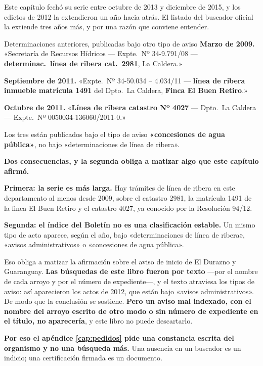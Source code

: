 Este capítulo fechó su serie entre octubre de 2013 y diciembre de 2015, y los edictos de 2012
la extendieron un año hacia atrás. El listado del buscador oficial la extiende tres años más,
y por una razón que conviene entender.

\begin{ficha}{Determinaciones anteriores, publicadas bajo otro tipo de aviso}
\textbf{Marzo de 2009.} «Secretaría de Recursos Hídricos --- Expte.\ Nº 34-9.791/08 ---
\textbf{determinac.\ línea de ribera cat.\ 2981}, La Caldera.»

\textbf{Septiembre de 2011.} «Expte.\ Nº 34-50.034 -- 4.034/11 --- \textbf{línea de ribera
inmueble matrícula 1491} del Dpto.\ La Caldera, \textbf{Finca El Buen Retiro}.»

\textbf{Octubre de 2011.} «\textbf{Línea de ribera catastro Nº 4027} --- Dpto.\ La Caldera ---
Expte.\ Nº 0050034-136060/2011-0.»

Los tres están publicados bajo el tipo de aviso \textbf{«concesiones de agua pública»}, no bajo
«determinaciones de línea de ribera».
\end{ficha}

\begin{cautela}
\textbf{Dos consecuencias, y la segunda obliga a matizar algo que este capítulo afirmó.}

\textbf{Primera: la serie es más larga.} Hay trámites de línea de ribera en este
departamento al menos desde 2009, sobre el catastro 2981, la
matrícula 1491 de la finca El Buen Retiro y el catastro 4027, ya conocido por la Resolución 94/12.

\textbf{Segunda: el índice del Boletín no es una clasificación estable.} Un mismo tipo de acto
aparece, según el año, bajo «determinaciones de línea de ribera», «avisos administrativos» o
«concesiones de agua pública».

Eso obliga a matizar la afirmación sobre el aviso de inicio de El Durazno y Guaranguay.
\textbf{Las búsquedas de este libro fueron por texto} ---por el nombre de cada arroyo y por el
número de expediente---, y el texto atraviesa los tipos de aviso: así aparecieron los actos de
2012, que están bajo «avisos administrativos». De modo que la conclusión se sostiene.
\textbf{Pero un aviso mal indexado, con el nombre del arroyo escrito de otro modo o sin número
de expediente en el título, no aparecería}, y este libro no puede descartarlo.

\textbf{Por eso el apéndice \ref{cap:pedidos} pide una constancia escrita del organismo y no
una búsqueda más.} Una ausencia en un buscador es un indicio; una certificación firmada es un
documento.
\end{cautela}

